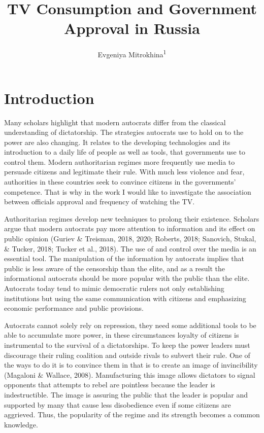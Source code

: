 \documentclass[
  english,
  man]{apa6}
\title{TV Consumption and Government Approval in Russia}
\author{Evgeniya Mitrokhina\textsuperscript{1}}
\date{}
\affiliation{\vspace{0.5cm}\textsuperscript{1} UW-Madison}
\begin{document}
\maketitle

\hypertarget{introduction}{%
\section{Introduction}\label{introduction}}

Many scholars highlight that modern autocrats differ from the classical understanding of dictatorship. The strategies autocrats use to hold on to the power are also changing. It relates to the developing technologies and its introduction to a daily life of people as well as tools, that governments use to control them. Modern authoritarian regimes more frequently use media to persuade citizens and legitimate their rule. With much less violence and fear, authorities in these countries seek to convince citizens in the governments' competence. That is why in the work I would like to investigate the association between officials approval and frequency of watching the TV.

Authoritarian regimes develop new techniques to prolong their existence. Scholars argue that modern autocrats pay more attention to information and its effect on public opinion (Guriev \& Treisman, 2018, 2020; Roberts, 2018; Sanovich, Stukal, \& Tucker, 2018; Tucker et al., 2018). The use of and control over the media is an essential tool. The manipulation of the information by autocrats implies that public is less aware of the censorship than the elite, and as a result the informational autocrats should be more popular with the public than the elite. Autocrats today tend to mimic democratic rulers not only establishing institutions but using the same communication with citizens and emphasizing economic performance and public provisions.

Autocrats cannot solely rely on repression, they need some additional tools to be able to accumulate more power, in these circumstances loyalty of citizens is instrumental to the survival of a dictatorships. To keep the power leaders must discourage their ruling coalition and outside rivals to subvert their rule. One of the ways to do it is to convince them in that is to create an image of invincibility (Magaloni \& Wallace, 2008). Manufacturing this image allows dictators to signal opponents that attempts to rebel are pointless because the leader is indestructible. The image is assuring the public that the leader is popular and supported by many that cause less disobedience even if some citizens are aggrieved. Thus, the popularity of the regime and its strength becomes a common knowledge.
\end{document}
